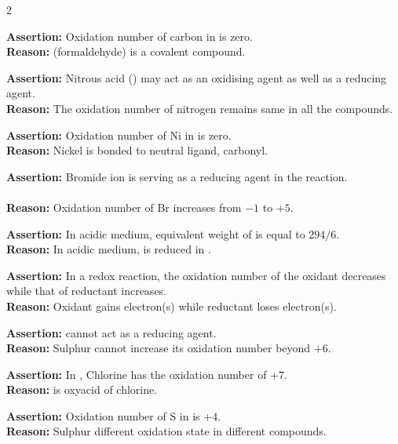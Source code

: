 \documentclass[10pt,a4paper]{article}
\begin{document}
\begin{multicols}{2}
\begin{questions}[start=1]
\item \textbf{Assertion:} Oxidation number of carbon in  is zero.\\
\textbf{Reason:}  (formaldehyde) is a covalent compound.

\item \textbf{Assertion:} Nitrous acid () may act as an oxidising agent as well as a reducing agent.\\
\textbf{Reason:} The oxidation number of nitrogen remains same in all the compounds.

\item \textbf{Assertion:} Oxidation number of Ni in \ce{[Ni(CO)4]} is zero.\\
\textbf{Reason:} Nickel is bonded to neutral ligand, carbonyl.

\item \textbf{Assertion:} Bromide ion is serving as a reducing agent in the reaction.\\
\\
\textbf{Reason:} Oxidation number of Br increases from $-1$ to $+5$.

\item \textbf{Assertion:} In acidic medium, equivalent weight of  is equal to $294/6$.\\
\textbf{Reason:} In acidic medium,  is reduced in .

\item \textbf{Assertion:} In a redox reaction, the oxidation number of the oxidant decreases while that of reductant increases.\\
\textbf{Reason:} Oxidant gains electron(s) while reductant loses electron(s).

\item \textbf{Assertion:}  cannot act as a reducing agent.\\
\textbf{Reason:} Sulphur cannot increase its oxidation number beyond $+6$.

\item \textbf{Assertion:} In , Chlorine has the oxidation number of $+7$.\\
\textbf{Reason:}  is oxyacid of chlorine.

\item \textbf{Assertion:} Oxidation number of S in  is $+4$.\\
\textbf{Reason:} Sulphur different oxidation state in different compounds.


\end{questions}
\end{multicols}
\end{document}
